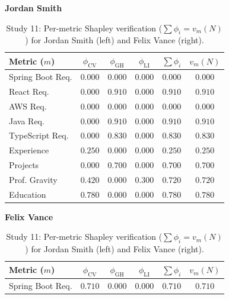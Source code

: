 \begin{table}[htbp]
    \centering
    \caption[Study 11: Per-metric Shapley breakdown]{Study 11: Per-metric Shapley verification ($\sum \phi_i = v_m(N)$) for Jordan Smith (left) and Felix Vance (right).}
    \label{tab:per-metric-shapley-verification}
    \scriptsize
    \setlength{\tabcolsep}{2.5pt}
    \begin{minipage}{0.48\textwidth}
        \centering
        \textbf{Jordan Smith} \\[1mm]
        \begin{tabular}{l c c c c c}
            \toprule
            \textbf{Metric} ($m$) & $\phi_{\mathrm{CV}}$ & $\phi_{\mathrm{GH}}$ & $\phi_{\mathrm{LI}}$ & $\sum \phi_i$ & $v_m(N)$ \\ \midrule
            Spring Boot Req. & $0.000$ & $0.000$ & $0.000$ & $0.000$ & $0.000$ \\
            React Req.       & $0.000$ & $0.910$ & $0.000$ & $0.910$ & $0.910$ \\
            AWS Req.         & $0.000$ & $0.000$ & $0.000$ & $0.000$ & $0.000$ \\
            Java Req.        & $0.000$ & $0.910$ & $0.000$ & $0.910$ & $0.910$ \\
            TypeScript Req.  & $0.000$ & $0.830$ & $0.000$ & $0.830$ & $0.830$ \\
            Experience       & $0.250$ & $0.000$ & $0.000$ & $0.250$ & $0.250$ \\
            Projects         & $0.000$ & $0.700$ & $0.000$ & $0.700$ & $0.700$ \\
            Prof. Gravity    & $0.420$ & $0.000$ & $0.300$ & $0.720$ & $0.720$ \\
            Education        & $0.780$ & $0.000$ & $0.000$ & $0.780$ & $0.780$ \\ \bottomrule
        \end{tabular}
    \end{minipage}
    \hfill
    \begin{minipage}{0.48\textwidth}
        \centering
        \textbf{Felix Vance} \\[1mm]
        \begin{tabular}{l c c c c c}
            \toprule
            \textbf{Metric} ($m$) & $\phi_{\mathrm{CV}}$ & $\phi_{\mathrm{GH}}$ & $\phi_{\mathrm{LI}}$ & $\sum \phi_i$ & $v_m(N)$ \\ \midrule
            Spring Boot Req. & $0.710$ & $0.000$ & $0.000$ & $0.710$ & $0.710$ \\

\end{tabular}
\end{minipage}
\end{table}
